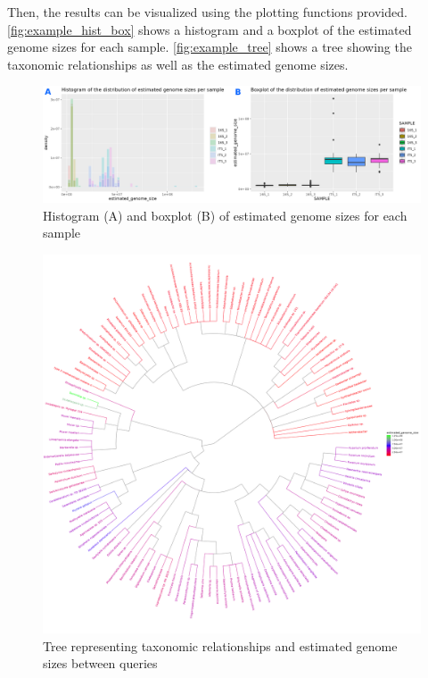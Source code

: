 \documentclass[
]{article}
\begin{document}
Then, the results can be visualized using the plotting functions
provided. \autoref{fig:example_hist_box} shows a histogram and a boxplot
of the estimated genome sizes for each sample.
\autoref{fig:example_tree} shows a tree showing the taxonomic
relationships as well as the estimated genome sizes.

\begin{figure}
\centering
\includegraphics[width=1\textwidth,height=\textheight]{example_hist_boxplot.png}
\caption{Histogram (A) and boxplot (B) of estimated genome sizes for
each sample\label{fig:example_hist_box}}
\end{figure}

\begin{figure}
\centering
\includegraphics[width=1\textwidth,height=\textheight]{example_tree.png}
\caption{Tree representing taxonomic relationships and estimated genome
sizes between queries\label{fig:example_tree}}
\end{figure}
\end{document}
